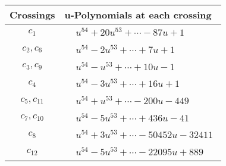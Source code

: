 \documentclass[1p]{elsarticle_modified}
\theoremstyle{definition}
\begin{document}
\begin{tabular}{m{50pt}|m{274pt}}
Crossings & \hspace{64pt}u-Polynomials at each crossing \\
\hline $$\begin{aligned}c_{1}\end{aligned}$$&$\begin{aligned}
&u^{54}+20 u^{53}+\cdots-87 u+1
\end{aligned}$\\
\hline $$\begin{aligned}c_{2},c_{6}\end{aligned}$$&$\begin{aligned}
&u^{54}-2 u^{53}+\cdots+7 u+1
\end{aligned}$\\
\hline $$\begin{aligned}c_{3},c_{9}\end{aligned}$$&$\begin{aligned}
&u^{54}- u^{53}+\cdots+10 u-1
\end{aligned}$\\
\hline $$\begin{aligned}c_{4}\end{aligned}$$&$\begin{aligned}
&u^{54}-3 u^{53}+\cdots+16 u+1
\end{aligned}$\\
\hline $$\begin{aligned}c_{5},c_{11}\end{aligned}$$&$\begin{aligned}
&u^{54}+u^{53}+\cdots-200 u-449
\end{aligned}$\\
\hline $$\begin{aligned}c_{7},c_{10}\end{aligned}$$&$\begin{aligned}
&u^{54}-5 u^{53}+\cdots+436 u-41
\end{aligned}$\\
\hline $$\begin{aligned}c_{8}\end{aligned}$$&$\begin{aligned}
&u^{54}+3 u^{53}+\cdots-50452 u-32411
\end{aligned}$\\
\hline $$\begin{aligned}c_{12}\end{aligned}$$&$\begin{aligned}
&u^{54}-5 u^{53}+\cdots-22095 u+889
\end{aligned}$\\
\hline
\end{tabular}\\~\\
\end{document}
